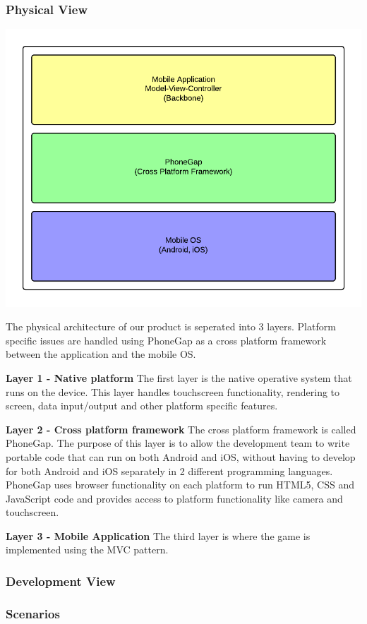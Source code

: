 \subsubsection{Physical View} %
\includegraphics[width=\textwidth]{pictures/physical_view}

The physical architecture of our product is seperated into 3 layers. Platform specific issues are handled using PhoneGap as a cross platform framework between the application and the mobile OS.

{\bf Layer 1 - Native platform}
The first layer is the native operative system that runs on the device. This layer handles touchscreen functionality, rendering to screen, data input/output and other platform specific features.

{\bf Layer 2 - Cross platform framework}
The cross platform framework is called PhoneGap. The purpose of this layer is to allow the development team to write portable code that can run on both Android and iOS, without having to develop for both Android and iOS separately in 2 different programming languages. PhoneGap uses browser functionality on each platform to run HTML5, CSS and JavaScript code and provides access to platform functionality like camera and touchscreen.

{\bf Layer 3 - Mobile Application}
The third layer is where the game is implemented using the MVC pattern. 


\subsubsection{Development View} %

\subsubsection{Scenarios} %
